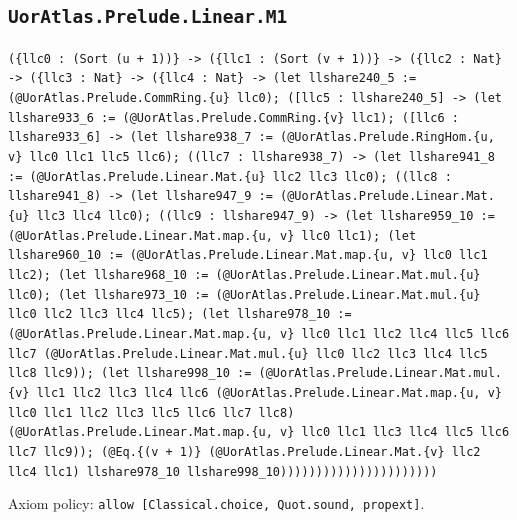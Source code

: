 \documentclass[11pt]{article}
\begin{document}
\subsection*{\texttt{UorAtlas.Prelude.Linear.M1}}
\noindent\texttt{(\{llc0 : (Sort (u + 1))\} -> (\{llc1 : (Sort (v + 1))\} -> (\{llc2 : Nat\} -> (\{llc3 : Nat\} -> (\{llc4 : Nat\} -> (let llshare240\_5 := (@UorAtlas.Prelude.CommRing.\{u\} llc0); ([llc5 : llshare240\_5] -> (let llshare933\_6 := (@UorAtlas.Prelude.CommRing.\{v\} llc1); ([llc6 : llshare933\_6] -> (let llshare938\_7 := (@UorAtlas.Prelude.RingHom.\{u, v\} llc0 llc1 llc5 llc6); ((llc7 : llshare938\_7) -> (let llshare941\_8 := (@UorAtlas.Prelude.Linear.Mat.\{u\} llc2 llc3 llc0); ((llc8 : llshare941\_8) -> (let llshare947\_9 := (@UorAtlas.Prelude.Linear.Mat.\{u\} llc3 llc4 llc0); ((llc9 : llshare947\_9) -> (let llshare959\_10 := (@UorAtlas.Prelude.Linear.Mat.map.\{u, v\} llc0 llc1); (let llshare960\_10 := (@UorAtlas.Prelude.Linear.Mat.map.\{u, v\} llc0 llc1 llc2); (let llshare968\_10 := (@UorAtlas.Prelude.Linear.Mat.mul.\{u\} llc0); (let llshare973\_10 := (@UorAtlas.Prelude.Linear.Mat.mul.\{u\} llc0 llc2 llc3 llc4 llc5); (let llshare978\_10 := (@UorAtlas.Prelude.Linear.Mat.map.\{u, v\} llc0 llc1 llc2 llc4 llc5 llc6 llc7 (@UorAtlas.Prelude.Linear.Mat.mul.\{u\} llc0 llc2 llc3 llc4 llc5 llc8 llc9)); (let llshare998\_10 := (@UorAtlas.Prelude.Linear.Mat.mul.\{v\} llc1 llc2 llc3 llc4 llc6 (@UorAtlas.Prelude.Linear.Mat.map.\{u, v\} llc0 llc1 llc2 llc3 llc5 llc6 llc7 llc8) (@UorAtlas.Prelude.Linear.Mat.map.\{u, v\} llc0 llc1 llc3 llc4 llc5 llc6 llc7 llc9)); (@Eq.\{(v + 1)\} (@UorAtlas.Prelude.Linear.Mat.\{v\} llc2 llc4 llc1) llshare978\_10 llshare998\_10))))))))))))))))))))))}\par
\noindent Axiom policy: \texttt{allow [Classical.choice, Quot.sound, propext]}.\par
\end{document}
